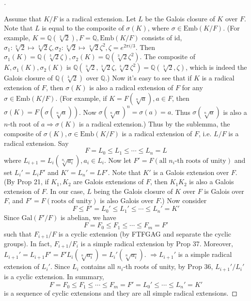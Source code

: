 \documentclass{article}
\theoremstyle{definition}
\newenvironment{proofs}[1][\proofname]{%
  \begin{proof}[#1]$ $\par\nobreak\ignorespaces
}{%
  \end{proof}
}
\newcommand{\QQ}{\mathbb Q}
\newcommand{\Ra}{\Rightarrow}
\newcommand{\Gal}{\text{Gal}}
\begin{document}
\begin{proofs}
	Assume that $K/F$ is a radical extension.
	Let $L$ be the Galois closure of $K$ over $F$.
	Note that $L$ is equal to the composite of $\sigma(K)$, where $\sigma \in \text{Emb}(K/F)$.
	(For example, $K = \QQ(\sqrt[3]{2}), F = \QQ, \text{Emb}(K/F)$ consists of id, $\sigma_1: \sqrt[3]{2} \mapsto \sqrt[3]{2} \zeta, \sigma_2: \sqrt[3]{2} \mapsto \sqrt[3]{2} \zeta^2, \zeta = e^{2 \pi i/3}$.
	Then $\sigma_1(K) = \QQ(\sqrt[3]{2} \zeta), \sigma_2(K) = \QQ(\sqrt[3]{2} \zeta^2)$.
	The composite of $K, \sigma_1(K), \sigma_2(K)$ is $\QQ(\sqrt[3]{2}, \sqrt[3]{2} \zeta, \sqrt[3]{2} \zeta^2) = \QQ(\sqrt[3]{2}, \zeta)$, which is indeed the Galois closure of $\QQ(\sqrt[3]{2})$ over $\QQ$.)
	Now it's easy to see that if $K$ is a radical extension of $F$, then $\sigma(K)$ is also a radical extension of $F$ for any $\sigma \in \text{Emb}(K/F)$.
	(For example, if $K = F(\sqrt[n]{a}), a \in F$, then $\sigma(K) = F(\sigma(\sqrt[n]{a}))$.
	Now $\sigma(\sqrt[n]{a})^n = \sigma(a) = a$.
	Thus $\sigma(\sqrt[n]{a})$ is also a $n$-th root of $a \Ra \sigma(K)$ is a radical extension.)
	Thus by the sublemma, the composite of $\sigma(K), \sigma \in \text{Emb}(K/F)$ is a radical extension of $F$, i.e. $L/F$ is a radical extension.
	Say 
	\[
		F = L_0 \leq L_1 \leq \cdots \leq L_n = L
	\]
	where $L_{i + 1} = L_i(\sqrt[n_i]{a_i}), a_i \in L_i$.
	Now let $F' = F(\text{all } n_i \text{-th roots of unity})$ and set $L_i' = L_i F'$ and $K' = L_n' = L F'$.
	Note that $K'$ is a Galois extension over $F$.
	(By Prop 21, if $K_1, K_2$ are Galois extensions of $F$, then $K_1 K_2$ is also a Galois extension of $F$.
	In our case, $L$ being the Galois closure of $K$ over $F$ is Galois over $F$, and $F' = F(\text{roots of unity})$ is also Galois over $F$.)
	Now consider 
	\[
		F \leq F' = L_0' \leq L_1' \leq \cdots \leq L_n' = K'
	\]
	Since $\Gal(F'/F)$ is abelian, we have 
	\[
		F = F_0 \leq F_1 \leq \cdots \leq F_m = F'
	\]
	such that $F_{i + 1}/F$ is a cyclic extension (by FTFGAG and separate the cyclic groups).
	In fact, $F_{i + 1}/F_i$ is a simple radical extension by Prop 37.
	Moreover, $L_{i + 1}' = L_{i + 1} F' = F' L_i(\sqrt[n]{a_i}) = L_i'(\sqrt[n]{a_i})$.
	$\Ra L_{i + 1}'$ is a simple radical extension of $L_i'$.
	Since $L_i$ contains all $n_i$-th roots of unity, by Prop 36, $L_{i + 1}'/L_i'$ is a cyclic extension.
	In summary, 
	\[
		F = F_0 \leq F_1 \leq \cdots \leq F_m = F' = L_0' \leq \cdots \leq L_n' = K'
	\]
	is a sequence of cyclic extensions and they are all simple radical extensions.
\end{proofs}
\end{document}
